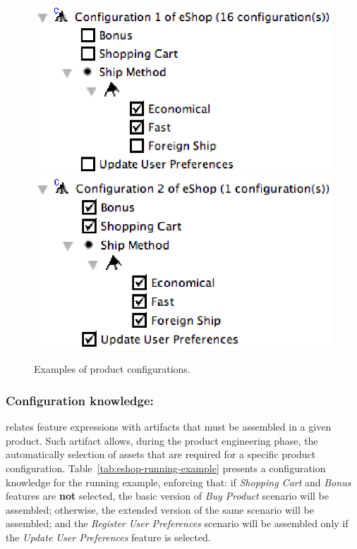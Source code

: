 \documentclass{llncs}
\begin{document}
\begin{figure}[h]
  \centerline{
    \mbox{\includegraphics[scale=0.5]{img/pc-01.eps}}
    \mbox{\includegraphics[scale=0.5]{img/pc-02.eps}}
  }
  \caption{Examples of product configurations.}
  \label{fig:product-config-01-02}
  \end{figure}

\subsubsection{Configuration knowledge:}

relates feature expressions with artifacts that must be assembled in a given
product. Such artifact allows, during the product engineering phase, the automatically selection of assets that are 
required for a specific product configuration. Table~\ref{tab:eshop-running-example} presents a configuration knowledge 
for the running example, enforcing that: if \emph{Shopping Cart} and \emph{Bonus} features are {\bf not} selected, the 
basic version of \emph{Buy Product} scenario will be assembled; otherwise, the extended version of the same 
scenario will be assembled; and the \emph{Register User Preferences} scenario will be assembled only if the \emph{Update 
User Preferences} feature is selected.
\end{document}
